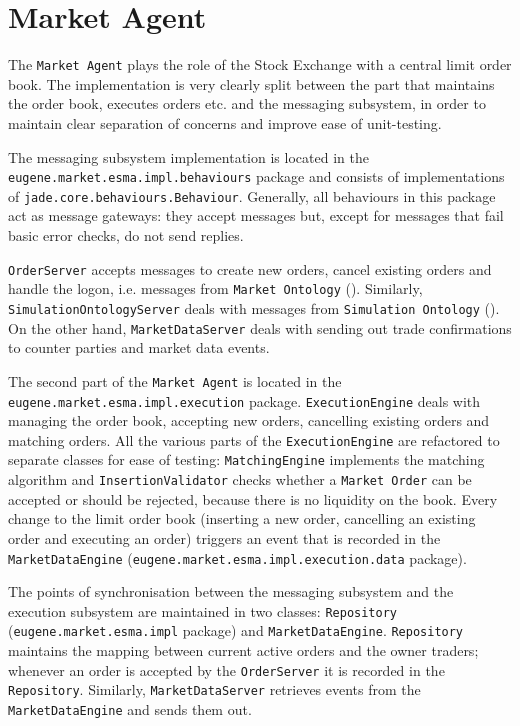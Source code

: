 \section{Market Agent}
\label{Chapters/Implementation/Market-Agent}
The \texttt{Market Agent} plays the role of the Stock Exchange with a central limit order book. The implementation is very clearly split between the part that maintains the order book, executes orders etc. and the messaging subsystem, in order to maintain clear separation of concerns and improve ease of unit-testing. 

The messaging subsystem implementation is located in the \\\texttt{eugene.market.esma.impl.behaviours} package and consists of implementations of \texttt{jade.core.behaviours.Behaviour}. Generally, all behaviours in this package act as message gateways: they accept messages but, except for messages that fail basic error checks, do not send replies.  

\texttt{OrderServer} accepts messages to create new orders, cancel existing orders and handle the logon, i.e. messages from \texttt{Market Ontology} (). Similarly, \texttt{SimulationOntologyServer} deals with messages from \texttt{Simulation Ontology} (). On the other hand, \texttt{MarketDataServer} deals with sending out trade confirmations to counter parties and market data events.

The second part of the \texttt{Market Agent} is located in the \\ \texttt{eugene.market.esma.impl.execution} package. \texttt{ExecutionEngine} deals with managing the order book, accepting new orders, cancelling existing orders and matching orders. All the various parts of the \texttt{ExecutionEngine} are refactored to separate classes for ease of testing: \texttt{MatchingEngine} implements the matching algorithm and \texttt{InsertionValidator} checks whether a \texttt{Market Order} can be accepted or should be rejected, because there is no liquidity on the book. Every change to the limit order book (inserting a new order, cancelling an existing order and executing an order) triggers an event that is recorded in the \texttt{MarketDataEngine} (\texttt{eugene.market.esma.impl.execution.data} package).

The points of synchronisation between the messaging subsystem and the execution subsystem are maintained in two classes: \texttt{Repository} (\texttt{eugene.market.esma.impl} package) and \texttt{MarketDataEngine}.  \texttt{Repository} maintains the mapping between current active orders and the owner traders; whenever an order is accepted by the \texttt{OrderServer} it is recorded in the \texttt{Repository}. Similarly, \texttt{MarketDataServer} retrieves events from the \texttt{MarketDataEngine} and sends them out.

